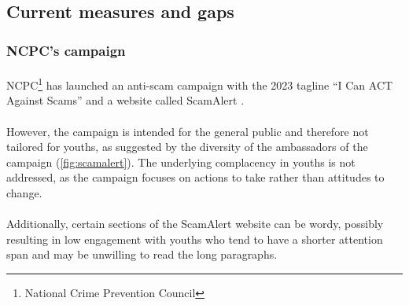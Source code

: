 \documentclass[a4paper]{article}
\begin{document}
\subsection{Current measures and gaps}
\subsubsection{NCPC's campaign}
\paragraph{} NCPC\footnote{National Crime Prevention Council} has launched an
anti-scam campaign with the 2023 tagline ``I Can ACT Against Scams''
\parencite{Sun.2023} and a website called ScamAlert \parencite{NCPC}.

\paragraph{} However, the campaign is intended for the general public and
therefore not tailored for youths, as suggested by the diversity of the
ambassadors of the campaign (\cref{fig:scamalert}). The underlying complacency
in youths is not addressed, as the campaign focuses on actions to take rather
than attitudes to change.

\paragraph{} Additionally, certain sections of the ScamAlert website can be
wordy, possibly resulting in low engagement with youths who tend to have a
shorter attention span \parencite{ChowHari.2022} and may be unwilling to read
the long paragraphs.
\end{document}
